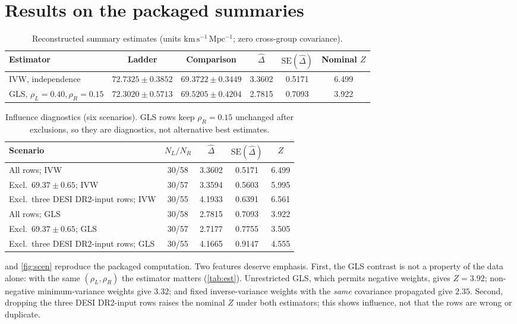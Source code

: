 \documentclass[11pt,a4paper]{article}
\theoremstyle{remark}\newtheorem{remark}{Remark}
\newcommand{\kmsMpc}{\mathrm{km\,s^{-1}\,Mpc^{-1}}}
\begin{document}
\section{Results on the packaged summaries}\label{sec:results}
\begin{table}[t]\centering\small
\caption{Reconstructed summary estimates (units $\kmsMpc$; zero cross-group covariance).}\label{tab:base}
\begin{tabular}{@{}lccccc@{}}\toprule
Estimator & Ladder & Comparison & $\widehat\Delta$ & $\mathrm{SE}(\widehat\Delta)$ & Nominal $Z$\\\midrule
IVW, independence & $72.7325\pm0.3852$ & $69.3722\pm0.3449$ & 3.3602 & 0.5171 & 6.499\\
GLS, $\rho_L{=}0.40,\rho_R{=}0.15$ & $72.3020\pm0.5713$ & $69.5205\pm0.4204$ & 2.7815 & 0.7093 & 3.922\\\bottomrule
\end{tabular}\end{table}
\begin{table}[t]\centering\small
\caption{Influence diagnostics (six scenarios). GLS rows keep $\rho_R=0.15$ unchanged after exclusions, so they are diagnostics, not alternative best estimates.}\label{tab:scen}
\begin{tabular}{@{}lcccc@{}}\toprule
Scenario & $N_L/N_R$ & $\widehat\Delta$ & $\mathrm{SE}(\widehat\Delta)$ & $Z$\\\midrule
All rows; IVW & 30/58 & 3.3602 & 0.5171 & 6.499\\
Excl.\ $69.37\pm0.65$; IVW & 30/57 & 3.3594 & 0.5603 & 5.995\\
Excl.\ three DESI DR2-input rows; IVW & 30/55 & 4.1933 & 0.6391 & 6.561\\
All rows; GLS & 30/58 & 2.7815 & 0.7093 & 3.922\\
Excl.\ $69.37\pm0.65$; GLS & 30/57 & 2.7177 & 0.7755 & 3.505\\
Excl.\ three DESI DR2-input rows; GLS & 30/55 & 4.1665 & 0.9147 & 4.555\\\bottomrule
\end{tabular}\end{table}
 and \cref{fig:scen} reproduce the packaged computation. Two features deserve emphasis. First, the GLS contrast is not a property of the data alone: with the same $(\rho_L,\rho_R)$ the estimator matters (\cref{tab:est}). Unrestricted GLS, which permits negative weights, gives $Z=3.92$; non-negative minimum-variance weights give $3.32$; and fixed inverse-variance weights with the \emph{same} covariance propagated give $2.35$. Second, dropping the three DESI DR2-input rows raises the nominal $Z$ under both estimators; this shows influence, not that the rows are wrong or duplicate.
\end{document}
